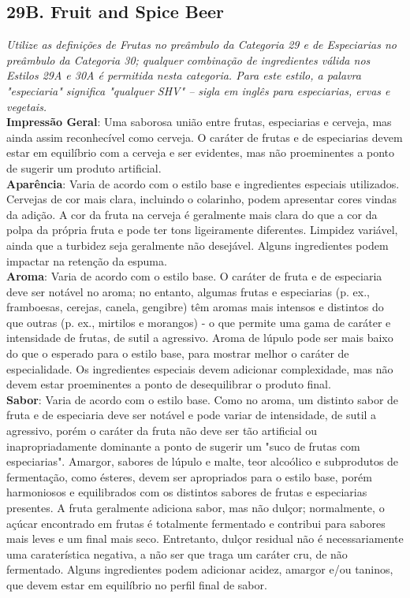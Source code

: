 \subsection*{29B. Fruit and Spice Beer}
\textit{Utilize as definições de Frutas no preâmbulo da Categoria 29 e de Especiarias no preâmbulo da Categoria 30; qualquer combinação de ingredientes válida nos Estilos 29A e 30A é permitida nesta categoria. Para este estilo, a palavra "especiaria" significa "qualquer SHV" – sigla em inglês para especiarias, ervas e vegetais.}\\
\textbf{Impressão Geral}: Uma saborosa união entre frutas, especiarias e cerveja, mas ainda assim reconhecível como cerveja. O caráter de frutas e de especiarias devem estar em equilíbrio com a cerveja e ser evidentes, mas não proeminentes a ponto de sugerir um produto artificial. \\
\textbf{Aparência}: Varia de acordo com o estilo base e ingredientes especiais utilizados. Cervejas de cor mais clara, incluindo o colarinho, podem apresentar cores vindas da adição. A cor da fruta na cerveja é geralmente mais clara do que a cor da polpa da própria fruta e pode ter tons ligeiramente diferentes. Limpidez variável, ainda que a turbidez seja geralmente não desejável. Alguns ingredientes podem impactar na retenção da espuma. \\
\textbf{Aroma}: Varia de acordo com o estilo base. O caráter de fruta e de especiaria deve ser notável no aroma; no entanto, algumas frutas e especiarias (p. ex., framboesas, cerejas, canela, gengibre) têm aromas mais intensos e distintos do que outras (p. ex., mirtilos e morangos) - o que permite uma gama de caráter e intensidade de frutas, de sutil a agressivo. Aroma de lúpulo pode ser mais baixo do que o esperado para o estilo base, para mostrar melhor o caráter de especialidade. Os ingredientes especiais devem adicionar complexidade, mas não devem estar proeminentes a ponto de desequilibrar o produto final. \\
\textbf{Sabor}: Varia de acordo com o estilo base. Como no aroma, um distinto sabor de fruta e de especiaria deve ser notável e pode variar de intensidade, de sutil a agressivo, porém o caráter da fruta não deve ser tão artificial ou inapropriadamente dominante a ponto de sugerir um "suco de frutas com especiarias". Amargor, sabores de lúpulo e malte, teor alcoólico e subprodutos de fermentação, como ésteres, devem ser apropriados para o estilo base, porém harmoniosos e equilibrados com os distintos sabores de frutas e especiarias presentes. A fruta geralmente adiciona sabor, mas não dulçor; normalmente, o açúcar encontrado em frutas é totalmente fermentado e contribui para sabores mais leves e um final mais seco. Entretanto, dulçor residual não é necessariamente uma caraterística negativa, a não ser que traga um caráter cru, de não fermentado. Alguns ingredientes podem adicionar acidez, amargor e/ou taninos, que devem estar em equilíbrio no perfil final de sabor. \\
